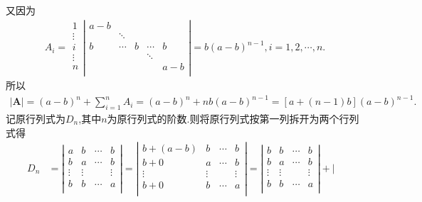 \documentclass[../../main.tex]{subfiles}%
\begin{document}
\begin{solution}
又因为
\begin{align*}
A_i=\begin{array}{l}
1\\
\vdots\\
i\\
\vdots\\
n\\
\end{array}\left| \begin{matrix}
a-b&		&		&		&		\\
&		\ddots&		&		&		\\
b&		\cdots&		b&		\cdots&		b\\
&		&		&		\ddots&		\\
&		&		&		&		a-b\\
\end{matrix} \right|=b\left( a-b \right) ^{n-1},i=1,2,\cdots ,n. 
\end{align*}
所以
\begin{align*}
|\boldsymbol{A}|=\left( a-b \right) ^n+\sum_{i=1}^n{A_i}=\left( a-b \right) ^n+nb\left( a-b \right) ^{n-1}=\left[ a+\left( n-1 \right) b \right] \left( a-b \right) ^{n-1}.
\end{align*}
{\color{blue}}
记原行列式为$D_n$,其中$n$为原行列式的阶数.则将原行列式按第一列拆开为两个行列式得
\begin{align*}
D_n&=\left| \begin{matrix}
a&		b&		\cdots&		b\\
b&		a&		\cdots&		b\\
\vdots&		\vdots&		&		\vdots\\
b&		b&		\cdots&		a\\
\end{matrix} \right|=\left| \begin{matrix}
b+\left( a-b \right)&		b&		\cdots&		b\\
b+0&		a&		\cdots&		b\\
\vdots&		\vdots&		&		\vdots\\
b+0&		b&		\cdots&		a\\
\end{matrix} \right|=\left| \begin{matrix}
b&		b&		\cdots&		b\\
b&		a&		\cdots&		b\\
\vdots&		\vdots&		&		\vdots\\
b&		b&		\cdots&		a\\
\end{matrix} \right|+\left| \begin{matrix}

\end{matrix}
\end{align*}
\end{solution}
\end{document}
